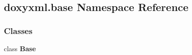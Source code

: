\subsection{doxyxml.\+base Namespace Reference}
\label{namespacedoxyxml_1_1base}
\subsubsection*{Classes}
\begin{DoxyCompactItemize}
\item 
class {\bf Base}
\end{DoxyCompactItemize}
